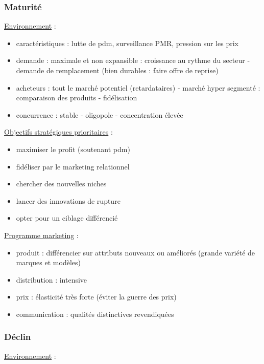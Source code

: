 			\subsubsection{Maturité}
			\underline{Environnement} :
		
			\begin{itemize}
				\item caractéristiques : lutte de pdm, surveillance PMR, pression sur les prix
				\item demande : maximale et non expansible : croissance au rythme du secteur - demande de remplacement (bien durables : faire offre de reprise)
				\item acheteurs : tout le marché potentiel (retardataires) - marché hyper segmenté : comparaison des produits - fidélisation
				\item concurrence : stable - oligopole - concentration élevée
			\end{itemize}
			\n
			\underline{Objectifs stratégiques prioritaires} :
			
			\begin{itemize}
				\item maximiser le profit (soutenant pdm)
				\item fidéliser par le marketing relationnel				
				\item chercher des nouvelles niches
				\item lancer des innovations de rupture
				\item opter pour un ciblage différencié
			\end{itemize}
			\n
			\underline{Programme marketing} :
			
			\begin{itemize}
				\item produit : différencier sur attributs nouveaux ou améliorés (grande variété de marques et modèles)
				\item distribution : intensive
				\item prix : élasticité très forte (éviter la guerre des prix)
				\item communication : qualités distinctives revendiquées
			\end{itemize}
			
			
			
			\subsubsection{Déclin}
			
			\underline{Environnement} :
		
